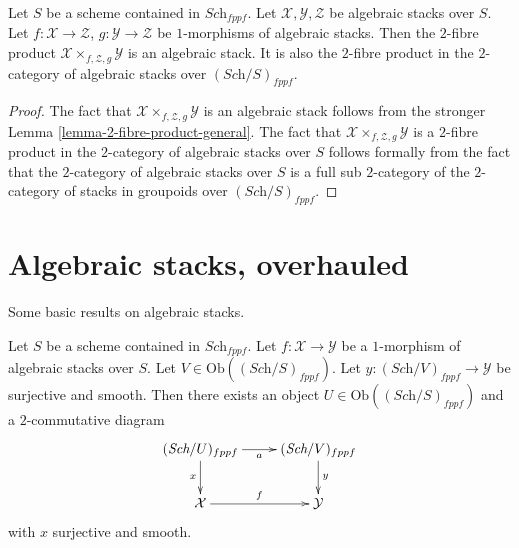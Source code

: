 \begin{lemma}
\label{lemma-2-fibre-product}
Let $S$ be a scheme contained in $\textit{Sch}_{fppf}$.
Let $\mathcal{X}, \mathcal{Y}, \mathcal{Z}$ be algebraic stacks over $S$.
Let $f : \mathcal{X} \to \mathcal{Z}$, $g : \mathcal{Y} \to \mathcal{Z}$
be $1$-morphisms of algebraic stacks. Then the $2$-fibre product
$\mathcal{X} \times_{f, \mathcal{Z}, g} \mathcal{Y}$ is an algebraic stack.
It is also the $2$-fibre product in the $2$-category of algebraic stacks
over $(\textit{Sch}/S)_{fppf}$.
\end{lemma}

\begin{proof}
The fact that $\mathcal{X} \times_{f, \mathcal{Z}, g} \mathcal{Y}$ is an
algebraic stack follows from the stronger
Lemma \ref{lemma-2-fibre-product-general}.
The fact that $\mathcal{X} \times_{f, \mathcal{Z}, g} \mathcal{Y}$
is a $2$-fibre product in the $2$-category of algebraic stacks over $S$
follows formally from the fact that the $2$-category of algebraic stacks
over $S$ is a full sub $2$-category of the $2$-category of stacks in
groupoids over $(\textit{Sch}/S)_{fppf}$.
\end{proof}







\section{Algebraic stacks, overhauled}
\label{section-overhaul}

\noindent
Some basic results on algebraic stacks.

\begin{lemma}
\label{lemma-lift-morphism-presentations}
Let $S$ be a scheme contained in $\textit{Sch}_{fppf}$.
Let $f : \mathcal{X} \to \mathcal{Y}$ be a $1$-morphism of algebraic
stacks over $S$.
Let $V \in \text{Ob}((\textit{Sch}/S)_{fppf})$.
Let $y : (\textit{Sch}/V)_{fppf} \to \mathcal{Y}$ be surjective and smooth.
Then there exists an object $U \in \text{Ob}((\textit{Sch}/S)_{fppf})$
and a $2$-commutative diagram
$$
\xymatrix{
(\textit{Sch}/U)_{fppf} \ar[r]_a \ar[d]_x &
(\textit{Sch}/V)_{fppf} \ar[d]^y \\
\mathcal{X} \ar[r]^f & \mathcal{Y}
}
$$
with $x$ surjective and smooth.
\end{lemma}

